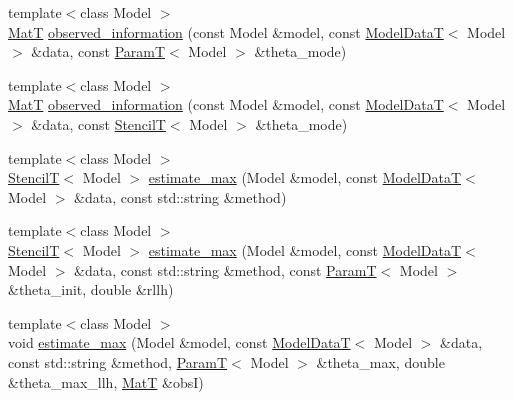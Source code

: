 \begin{DoxyCompactItemize}
\item 
{\footnotesize template$<$class Model $>$ }\\\hyperlink{namespacemappel_a7091ab87c528041f7e2027195fad8915}{MatT} \hyperlink{namespacemappel_1_1methods_a83244dbe0995e8698475a12d34fb2f35}{observed\+\_\+information} (const Model \&model, const \hyperlink{namespacemappel_a97f050df953605381ae9c901c3b125f1}{Model\+DataT}$<$ Model $>$ \&data, const \hyperlink{namespacemappel_a667925cb0d6c0e49f2f035cc5a9a6857}{ParamT}$<$ Model $>$ \&theta\+\_\+mode)
\item 
{\footnotesize template$<$class Model $>$ }\\\hyperlink{namespacemappel_a7091ab87c528041f7e2027195fad8915}{MatT} \hyperlink{namespacemappel_1_1methods_a0e3bec3c7363eb6005abdeaa151decb9}{observed\+\_\+information} (const Model \&model, const \hyperlink{namespacemappel_a97f050df953605381ae9c901c3b125f1}{Model\+DataT}$<$ Model $>$ \&data, const \hyperlink{namespacemappel_a3a06598240007876f8c4bf834ad86197}{StencilT}$<$ Model $>$ \&theta\+\_\+mode)
\item 
{\footnotesize template$<$class Model $>$ }\\\hyperlink{namespacemappel_a3a06598240007876f8c4bf834ad86197}{StencilT}$<$ Model $>$ \hyperlink{namespacemappel_1_1methods_a7f4a5561497c243edaa6f55fddf0ec4e}{estimate\+\_\+max} (Model \&model, const \hyperlink{namespacemappel_a97f050df953605381ae9c901c3b125f1}{Model\+DataT}$<$ Model $>$ \&data, const std\+::string \&method)
\item 
{\footnotesize template$<$class Model $>$ }\\\hyperlink{namespacemappel_a3a06598240007876f8c4bf834ad86197}{StencilT}$<$ Model $>$ \hyperlink{namespacemappel_1_1methods_abde9a4b10690b8eefe709d730fac69d9}{estimate\+\_\+max} (Model \&model, const \hyperlink{namespacemappel_a97f050df953605381ae9c901c3b125f1}{Model\+DataT}$<$ Model $>$ \&data, const std\+::string \&method, const \hyperlink{namespacemappel_a667925cb0d6c0e49f2f035cc5a9a6857}{ParamT}$<$ Model $>$ \&theta\+\_\+init, double \&rllh)
\item 
{\footnotesize template$<$class Model $>$ }\\void \hyperlink{namespacemappel_1_1methods_a9494d0ddea2acc25bd92100b7587a1c1}{estimate\+\_\+max} (Model \&model, const \hyperlink{namespacemappel_a97f050df953605381ae9c901c3b125f1}{Model\+DataT}$<$ Model $>$ \&data, const std\+::string \&method, \hyperlink{namespacemappel_a667925cb0d6c0e49f2f035cc5a9a6857}{ParamT}$<$ Model $>$ \&theta\+\_\+max, double \&theta\+\_\+max\+\_\+llh, \hyperlink{namespacemappel_a7091ab87c528041f7e2027195fad8915}{MatT} \&obsI)

\end{DoxyCompactItemize}

